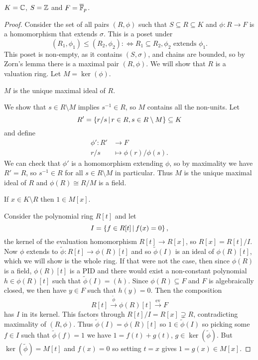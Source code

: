 \begin{example}
    $K = \mathbb{C}$, $S = \mathbb{Z}$ and $F = \overline{\mathbb{F}}_p$.
\end{example}

\begin{proof}
    Consider the set of all pairs $(R, \phi)$ such that $S \subseteq R \subseteq K$ and $\phi \colon R \to F$ is a homomorphism that extends $\sigma$.
    This is a poset under \[
        (R_1, \phi_1) \leq (R_2, \phi_2) :\Leftrightarrow R_1 \subseteq R_2, \phi_2 \text{ extends } \phi_1.
    \]
    This poset is non-empty, as it contains $(S, \sigma)$, and chains are bounded, so by Zorn's lemma there is a maximal pair $(R, \phi)$.
    We will show that $R$ is a valuation ring.
    Let $M = \ker (\phi)$.
    \begin{claim}
        $M$ is the unique maximal ideal of $R$.
    \end{claim}
    We show that $s \in R \setminus M$ implies $s^{-1} \in R$, so $M$ contains all the non-units.
    Let \[
        R' = \left\{ r / s \,\middle|\,  r \in R, s \in R \setminus M  \right\} \subseteq K
    \] and define
    \begin{align*}
        \phi' \colon R' &\to F \\
                    r/s &\mapsto \phi(r) / \phi(s).
    \end{align*}
    We can check that $\phi'$ is a homomorphism extending $\phi$, so by maximality we have $R' = R$, so $s^{-1} \in R$ for all $s \in R \setminus M$ in particular.
    Thus $M$ is the unique maximal ideal of $R$ and $\phi(R) \cong R / M$ is a field.

    \begin{claim}
        If $x \in K \setminus R$ then $1 \in M[x]$.
    \end{claim}
    Consider the polynomial ring $R[t]$ and let \[
        I = \left\{ f \in R[t] \,\middle|\, f(x) = 0 \right\},
    \] the kernel of the evaluation homomorphism $R[t] \to R[x]$, so $R[x] = R[t] / I$.
    Now $\phi$ extends to $\tilde{\phi} \colon R[t] \to \phi(R)[t]$ and so $\tilde{\phi}(I)$ is an ideal of $\phi(R)[t]$, which we will show is the whole ring.
    If that were not the case, then since $\phi(R)$ is a field, $\phi(R)[t]$ is a PID and there would exist a non-constant polynomial $h \in \phi(R)[t]$ such that $\tilde{\phi}(I) = (h)$.
    Since $\phi(R) \subseteq F$ and $F$ is algebraically closed, we then have $y \in F$ such that $h(y) = 0$.
    Then the composition \[
        R[t] \overset{\tilde{\phi}}{\to} \phi(R)[t] \overset{\text{ev}}{\to} F
    \] has $I$ in its kernel.
    This factors through $R[t] / I = R[x] \supsetneq R$, contradicting maximality of $(R, \phi)$.
    Thus $\tilde{\phi}(I) = \phi(R)[t]$ so $1 \in \tilde{\phi}(I)$ so picking some $f \in I$ such that $\tilde{\phi}(f) = 1$ we have $1 = f(t) + g(t)$, $g \in \ker(\tilde{\phi})$.
    But $\ker(\tilde{\phi}) = M[t]$ and $f(x) = 0$ so setting $t = x$ gives $1 = g(x) \in M[x]$.


\end{proof}
